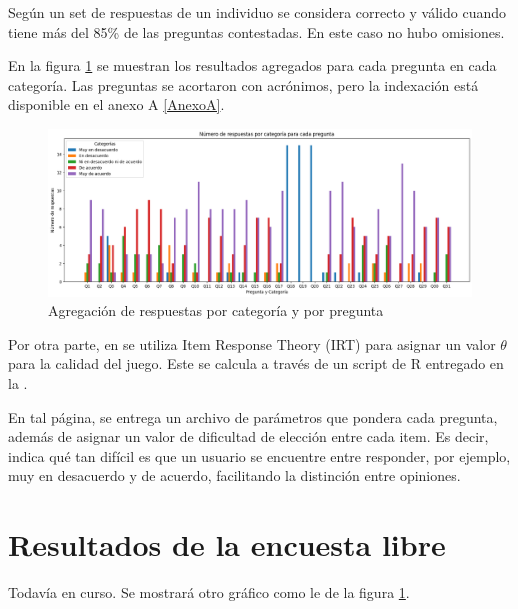 Según \cite{meegaplus} un set de respuestas de un individuo se considera correcto y válido cuando tiene más del 85\% de las preguntas contestadas. En este caso no hubo omisiones.

En la figura \ref{RespuestasAgregadas} se muestran los resultados agregados para cada pregunta en cada categoría. Las preguntas se acortaron con acrónimos, pero la indexación está disponible en el anexo A \ref{AnexoA}.

\begin{figure}[h]
	\centering
	\includegraphics[scale=.5]{imagenes/answers.png}
	\caption{Agregación de respuestas por categoría y por pregunta}
	\label{RespuestasAgregadas}
\end{figure}

Por otra parte, en \cite{meegaplus} se utiliza Item Response Theory (IRT) para asignar un valor $\theta$ para la calidad del juego. Este se calcula a través de un script de R entregado en la \href{http://www.gqs.ufsc.br/quality-evaluation/meega-plus/}{} \cite{meegaplusQualityEvaluationPage}.

En tal página, se entrega un archivo de parámetros que pondera cada pregunta, además de asignar un valor de dificultad de elección entre cada item. Es decir, indica qué tan difícil es que un usuario se encuentre entre responder, por ejemplo, muy en desacuerdo y de acuerdo, facilitando la distinción entre opiniones.




\section{Resultados de la encuesta libre}

Todavía en curso. Se mostrará otro gráfico como le de la figura \ref{RespuestasAgregadas}.
